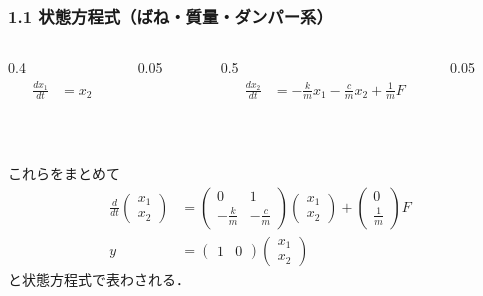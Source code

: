 \documentclass[10pt]{beamer}
\begin{document}
\begin{frame}[t]
\frametitle{1.1 状態方程式（ばね・質量・ダンパー系）}
 
\setcounter{eqncountersave}{\value{equation}} %
\addtocounter{equation}{-2} %
\begin{columns}[t]
\begin{column}{0.4\textwidth}
\begin{align}
  \frac{dx_1}{dt} &= x_2
\end{align}
\end{column}
\begin{column}{0.05\textwidth}

\end{column}
\begin{column}{0.5\textwidth}
\begin{align}
  \frac{dx_2}{dt} &= -\frac{k}{m} x_1 - \frac{c}{m} x_2 + \frac{1}{m} F
\end{align}
\end{column}
\begin{column}{0.05\textwidth}

\end{column}
\end{columns}
\ \\
\setcounter{equation}{\value{eqncountersave}} %

これらをまとめて
\begin{align}
 \frac{d}{dt} \left(\begin{array}{c}
               x_1 \\
         x_2
        \end{array}\right)
 &=
 \left(\begin{array}{cc}
        0            &         1     \\
  -\frac{k}{m} & - \frac{c}{m}
       \end{array}\right)
 \left(\begin{array}{c}
  x_1 \\
  x_2
       \end{array}\right)
 +
 \left(\begin{array}{c}
        0 \\
  \frac{1}{m}
       \end{array}\right)
 F  \\
 y &=
 \left(\begin{array}{cc}
             1 & 0
       \end{array}\right)
 \left(\begin{array}{c}
        x_1 \\
  x_2
       \end{array}\right) 
\end{align}
と状態方程式で表わされる．
\end{frame}
\end{document}

